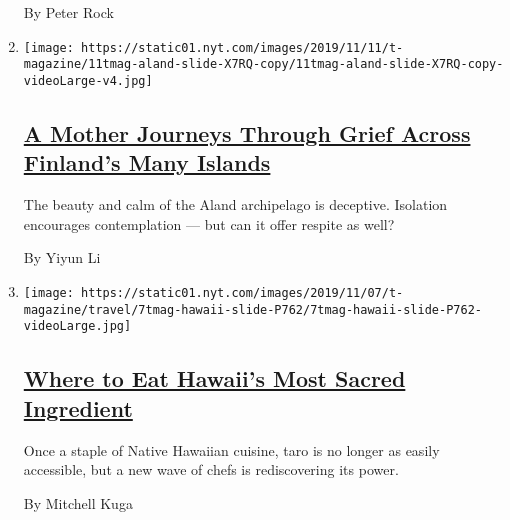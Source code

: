 \begin{enumerate}
  By Peter Rock
\item
  \texttt{[image: https://static01.nyt.com/images/2019/11/11/t-magazine/11tmag-aland-slide-X7RQ-copy/11tmag-aland-slide-X7RQ-copy-videoLarge-v4.jpg]}

  \hypertarget{a-mother-journeys-through-grief-across-finlands-many-islands}{%
  \subsection{\texorpdfstring{\href{/2019/11/12/t-magazine/mother-loses-son-travel-coping.html}{A
  Mother Journeys Through Grief Across Finland's Many
  Islands}}{A Mother Journeys Through Grief Across Finland's Many Islands}}\label{a-mother-journeys-through-grief-across-finlands-many-islands}}

  The beauty and calm of the Aland archipelago is deceptive. Isolation
  encourages contemplation --- but can it offer respite as well?

  By Yiyun Li
\item
  \texttt{[image: https://static01.nyt.com/images/2019/11/07/t-magazine/travel/7tmag-hawaii-slide-P762/7tmag-hawaii-slide-P762-videoLarge.jpg]}

  \hypertarget{where-to-eat-hawaiis-most-sacred-ingredient}{%
  \subsection{\texorpdfstring{\href{/2019/11/08/t-magazine/hawaii-restaurants.html}{Where
  to Eat Hawaii's Most Sacred
  Ingredient}}{Where to Eat Hawaii's Most Sacred Ingredient}}\label{where-to-eat-hawaiis-most-sacred-ingredient}}

  Once a staple of Native Hawaiian cuisine, taro is no longer as easily
  accessible, but a new wave of chefs is rediscovering its power.

  By Mitchell Kuga
\end{enumerate}

